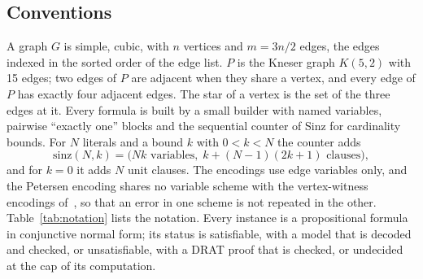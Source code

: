 \documentclass[11pt]{article}
\theoremstyle{definition}
\theoremstyle{remark}
\newcommand{\PG}{P}
\begin{document}
\subsection{Conventions}

A graph $G$ is simple, cubic, with $n$ vertices and $m = 3n/2$ edges, the edges indexed in the
sorted order of the edge list. $\PG$ is the Kneser graph $K(5,2)$ with 15 edges; two edges of $\PG$
are adjacent when they share a vertex, and every edge of $\PG$ has exactly four adjacent edges. The star of a vertex is the set of the three
edges at it. Every formula is built by a small builder with named variables, pairwise ``exactly one'' blocks and
the sequential counter of Sinz for cardinality bounds. For $N$ literals and a bound $k$ with
$0 < k < N$ the counter adds
\begin{equation}\label{eq:sinz}
\mathrm{sinz}(N,k) = \bigl(Nk \text{ variables},\; k + (N-1)(2k+1) \text{ clauses}\bigr),
\end{equation}
and for $k=0$ it adds $N$ unit clauses. The encodings use edge variables only, and the Petersen
encoding shares no variable scheme with the vertex-witness encodings of~\cite{Putman2026}, so that
an error in one scheme is not repeated in the other. Table~\ref{tab:notation} lists the notation. Every instance is a propositional formula in
conjunctive normal form; its status is satisfiable, with a model that is decoded and checked, or
unsatisfiable, with a DRAT proof that is checked, or undecided at the cap of its computation.
\end{document}
